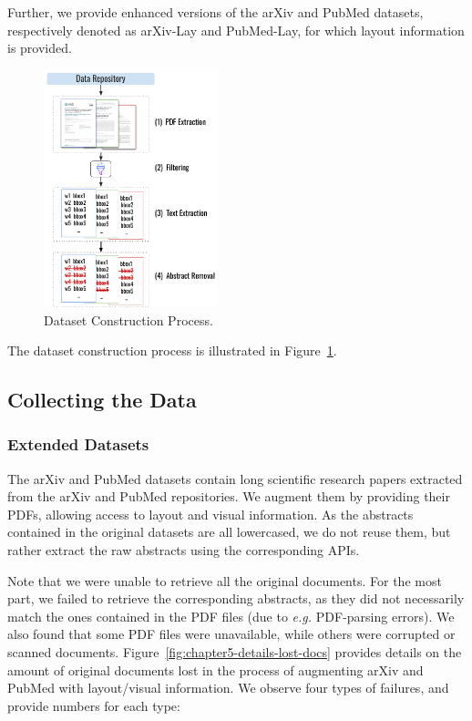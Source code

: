 Further, we provide enhanced versions of the arXiv and PubMed datasets, respectively denoted as arXiv-Lay and PubMed-Lay, for which layout information is provided.

\begin{figure}[ht]
\centering
    \includegraphics[width=0.45\textwidth]{images/chapter5/Dataset_Construction_Process.pdf}
  \caption{Dataset Construction Process.}
  \label{fig:chapter5-dataset-construction}
\end{figure}

The dataset construction process is illustrated in Figure~\ref{fig:chapter5-dataset-construction}. 

\subsection{Collecting the Data}

\subsubsection{Extended Datasets}

The arXiv and PubMed datasets \cite{cohan2018discourse} contain long scientific research papers extracted from the arXiv and PubMed repositories. We augment them by providing their PDFs, allowing access to layout and visual information. As the abstracts contained in the original datasets are all lowercased, we do not reuse them, but rather extract the raw abstracts using the corresponding APIs.

Note that we were unable to retrieve all the original documents. For the most part, we failed to retrieve the corresponding abstracts, as they did not necessarily match the ones contained in the PDF files (due to \textit{e.g.} PDF-parsing errors). We also found that some PDF files were unavailable, while others were corrupted or scanned documents. Figure~\ref{fig:chapter5-details-lost-docs} provides details on the amount of original documents lost in the process of augmenting arXiv and PubMed with layout/visual information. We observe four types of failures, and provide numbers for each type: 

